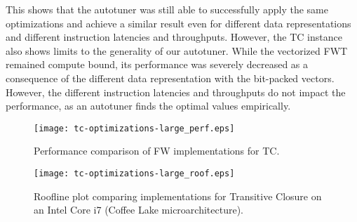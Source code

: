This shows that the autotuner was still able to successfully apply the same optimizations and achieve a similar result
even for different data representations and different instruction latencies and throughputs. However, the TC instance
also shows limits to the generality of our autotuner. While the vectorized FWT remained compute bound, its performance
was severely decreased as a consequence of the different data representation with the bit-packed vectors.
However, the different instruction latencies and throughputs do not impact the performance, as an autotuner
finds the optimal values empirically.

\begin{figure}[h]
    \centering
    \texttt{[image: tc-optimizations-large\_perf.eps]}
    \caption{Performance comparison of FW implementations for TC.}
    \label{fig:tc-perf}
\end{figure}
\begin{figure}[h]
    \centering
    \texttt{[image: tc-optimizations-large\_roof.eps]}
    \caption{Roofline plot comparing implementations for Transitive Closure on an Intel Core i7 (Coffee Lake microarchitecture).}
    \label{fig:tc-roof}
\end{figure}